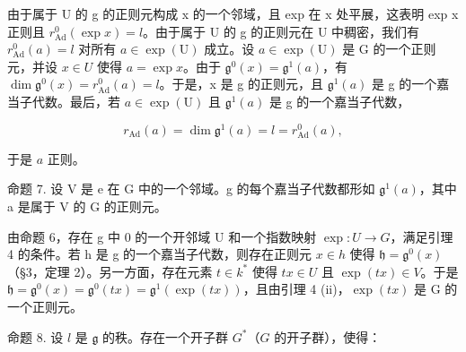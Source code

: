 由于属于 U 的 g 的正则元构成 x 的一个邻域，且 exp 在 x 处平展，这表明 exp x 正则且 \(r_{\mathrm{Ad}}^{0}(\exp x) = l\)。由于属于 U 的 g 的正则元在 U 中稠密，我们有 \(r_{\mathrm{Ad}}^{0}(a) = l\) 对所有 \(a \in \exp(\mathrm{U})\) 成立。设 \(a \in \exp(\mathrm{U})\) 是 G 的一个正则元，并设 \(x \in U\) 使得 \(a = \exp x\)。由于 \(\mathfrak{g}^{0}(x) = \mathfrak{g}^{1}(a)\)，有 \(\dim \mathfrak{g}^{0}(x) = r_{\mathrm{Ad}}^{0}(a) = l\)。于是，x 是 g 的正则元，且 \(\mathfrak{g}^{1}(a)\) 是 g 的一个嘉当子代数。最后，若 \(a \in \exp(\mathrm{U})\) 且 \(\mathfrak{g}^{1}(a)\) 是 g 的一个嘉当子代数，

\[
r _ {\mathrm{Ad}} (a) = \dim \mathfrak {g} ^ {1} (a) = l = r _ {\mathrm{Ad}} ^ {0} (a),
\]

于是 \(a\) 正则。

命题 7. 设 V 是 e 在 G 中的一个邻域。g 的每个嘉当子代数都形如 \(\mathfrak{g}^{1}(a)\)，其中 a 是属于 V 的 G 的正则元。

由命题 6，存在 g 中 0 的一个开邻域 U 和一个指数映射 \(\exp: U \to G\)，满足引理 4 的条件。若 h 是 g 的一个嘉当子代数，则存在正则元 \(x \in h\) 使得 \(\mathfrak{h} = \mathfrak{g}^{0}(x)\)（§3，定理 2）。另一方面，存在元素 \(t \in k^{*}\) 使得 \(tx \in U\) 且 \(\exp(tx) \in V\)。于是 \(\mathfrak{h} = \mathfrak{g}^{0}(x) = \mathfrak{g}^{0}(tx) = \mathfrak{g}^{1}(\exp(tx))\)，且由引理 4 (ii)，\(\exp(tx)\) 是 G 的一个正则元。

命题 8. 设 \(l\) 是 \(\mathfrak{g}\) 的秩。存在一个开子群 \(G^*\)（\(G\) 的开子群），使得：

